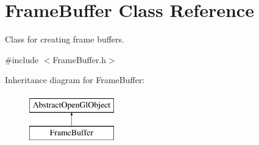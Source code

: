 \hypertarget{class_frame_buffer}{\section{Frame\-Buffer Class Reference}
\label{class_frame_buffer}
}


Class for creating frame buffers.  




{\ttfamily \#include $<$Frame\-Buffer.\-h$>$}

Inheritance diagram for Frame\-Buffer\-:\begin{figure}[H]
\begin{center}
\leavevmode
\includegraphics[height=2.000000cm]{class_frame_buffer}
\end{center}
\end{figure}
